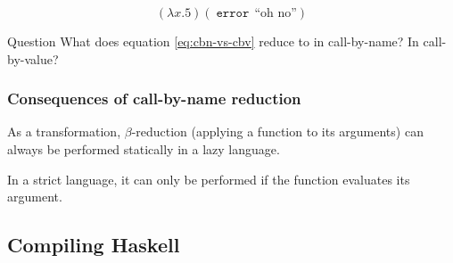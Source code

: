 \documentclass{beamer}
\DeclareMathOperator{\ErrorOp}{\mathtt{error}}
\newcommand{\Error}[1]{\ErrorOp{\, \text{#1}}}
\begin{document}
\begin{frame}
    \begin{equation}
        (\lambda x. 5) (\Error{``oh no''})
        \label{eq:cbn-vs-cbv}
    \end{equation}

    \begin{block}{Question}
        What does equation \ref{eq:cbn-vs-cbv} reduce to in call-by-name? In
        call-by-value?
    \end{block}
\end{frame}

\begin{frame}
    \frametitle{Consequences of call-by-name reduction}

    As a transformation, $\beta$-reduction (applying a function to its
    arguments) can always be performed statically in a lazy language.

    In a strict language, it can only be performed if the function
    \alert{evaluates its argument}.
\end{frame}

\subsection{Compiling Haskell}
\end{document}
